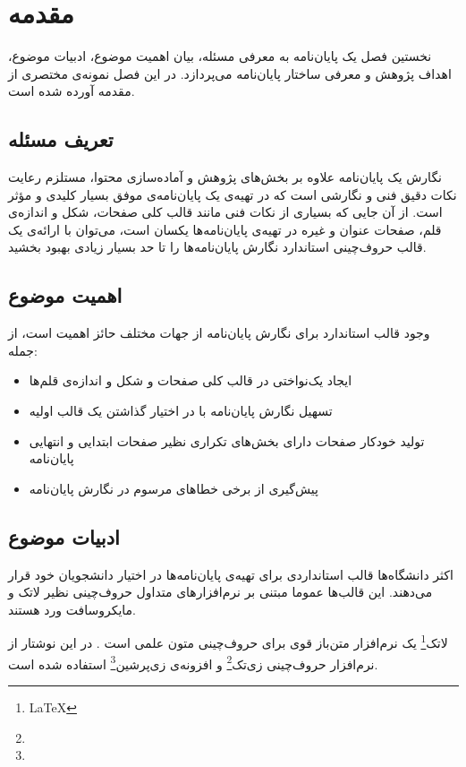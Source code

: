 
\chapter{مقدمه}

نخستین فصل یک پایان‌نامه به معرفی مسئله، بیان اهمیت موضوع، ادبیات موضوع،
اهداف پژوهش و معرفی ساختار پایان‌نامه می‌پردازد.
در این فصل نمونه‌ی مختصری از مقدمه آورده شده است.

\section{تعریف مسئله}

نگارش یک پایان‌نامه‌ علاوه بر بخش‌های پژوهش و آماده‌سازی محتوا،
مستلزم رعایت نکات دقیق فنی و نگارشی است 
که در تهیه‌ی یک پایان‌نامه‌ی موفق بسیار کلیدی و مؤثر است.
از آن جایی که بسیاری از نکات فنی مانند قالب کلی صفحات، شکل و اندازه‌ی قلم، 
صفحات عنوان و غیره در تهیه‌ی پایان‌نامه‌ها یکسان است،
می‌توان با ارائه‌ی یک قالب حروف‌چینی استاندارد 
نگارش پایان‌نامه‌ها را تا حد بسیار زیادی بهبود بخشید.

\section{اهمیت موضوع}

وجود قالب استاندارد برای نگارش پایان‌نامه از جهات مختلف حائز اهمیت است، از جمله:

\begin{itemize}
\item
ایجاد یک‌نواختی در قالب کلی صفحات و شکل و اندازه‌ی قلم‌ها
\item
تسهیل نگارش پایان‌نامه با در اختیار گذاشتن یک قالب اولیه 
\item
تولید خودکار صفحات دارای بخش‌های تکراری نظیر صفحات ابتدایی و انتهایی پایان‌نامه
\item
پیش‌گیری از برخی خطاهای مرسوم در نگارش پایان‌نامه
\end{itemize}

\section{ادبیات موضوع}

اکثر دانشگاه‌ها قالب استانداردی برای تهیه‌ی پایان‌نامه‌ها در اختیار دانشجویان خود قرار می‌دهند.
این قالب‌ها عموما مبتنی بر نرم‌افزارهای متداول حروف‌چینی نظیر لاتک و مایکروسافت ورد هستند.

 لاتک\footnote{\LaTeX} یک نرم‌افزار متن‌باز قوی برای حروف‌چینی متون علمی است \cite
 {knuth1984texbook, lamport1985LaTeX}.
در این نوشتار از نرم‌افزار حروف‌چینی زی‌تک\footnote{\XeTeX} 
 و افزونه‌ی زی‌پرشین\footnote{\XePersian}
 استفاده شده است.


